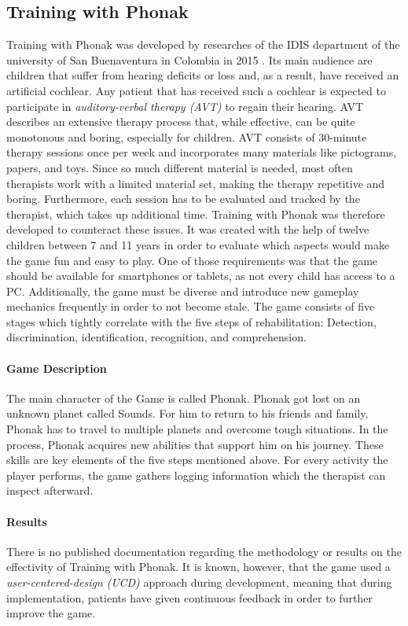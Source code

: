\documentclass[draft,final]{vutinfth} %
\begin{document}
\subsection{Training with Phonak}
Training with Phonak was developed by researches of the IDIS department of the university of San Buenaventura in Colombia in 2015 \cite{Phonak}. Its main audience are children that suffer from hearing deficits or loss and, as a result, have received an artificial cochlear. Any patient that has received such a cochlear is expected to participate in \emph{auditory-verbal therapy (AVT)} to regain their hearing. AVT describes an extensive therapy process that, while effective, can be quite monotonous and boring, especially for children. AVT consists of  30-minute therapy sessions once per week and incorporates many materials like pictograms, papers, and toys. Since so much different material is needed, most often therapists work with a limited material set, making the therapy repetitive and boring. Furthermore, each session has to be evaluated and tracked by the therapist, which takes up additional time. Training with Phonak was therefore developed to counteract these issues. It was created with the help of twelve children between 7 and 11 years in order to evaluate which aspects would make the game fun and easy to play. One of those requirements was that the game should be available for smartphones or tablets, as not every child has access to a PC. Additionally, the game must be diverse and introduce new gameplay mechanics frequently in order to not become stale. The game consists of five stages which tightly correlate with the five steps of rehabilitation: Detection, discrimination, identification, recognition, and comprehension.

\paragraph{Game Description}
The main character of the Game is called Phonak. Phonak got lost on an unknown planet called Sounds. For him to return to his friends and family, Phonak has to travel to multiple planets and overcome tough situations. In the process, Phonak acquires new abilities that support him on his journey. These skills are key elements of the five steps mentioned above. For every activity the player performs, the game gathers logging information which the therapist can inspect afterward.

\paragraph{Results}
There is no published documentation regarding the methodology or results on the effectivity of Training with Phonak. It is known, however, that the game used a \emph{user-centered-design (UCD)} approach during development, meaning that during implementation, patients have given continuous feedback in order to further improve the game.
\end{document}

